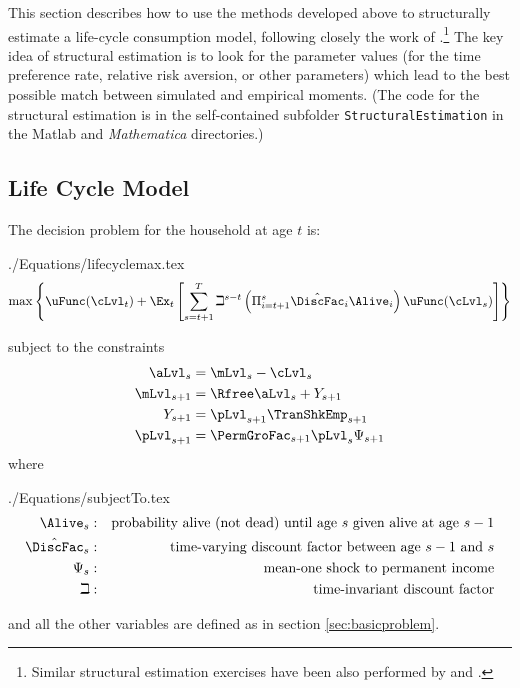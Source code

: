 \documentclass[titlepage, headings=optiontotocandhead]{\econtex}
\newcommand{\Mma}{\textit{Mathematica}}
\begin{document}
This section describes how to use the methods developed above to
structurally estimate a life-cycle consumption model, following
closely the work of
\cite{cagettiWprofiles}.\footnote{Similar structural
  estimation exercises have been also performed by
  \cite{palumbo:medical} and \cite{gpLifecycle}.} The key idea of
structural estimation is to look for the parameter values (for the
time preference rate, relative risk aversion, or other parameters)
which lead to the best possible match between simulated and empirical
moments.  (The code for the structural estimation is in the self-contained
subfolder \texttt{StructuralEstimation} in the Matlab and {\Mma} directories.)

\hypertarget{LifeCycleModel}{}
\subsection{Life Cycle Model}

The decision problem for the household at age $t$ is:
\begin{verbatimwrite}{./Equations/lifecyclemax.tex}
  \begin{equation}
    \max \left\{ \uFunc(\cLvl_{t})+\Ex_{t}\left[\sum_{s=t+1}^{T} {\beth}^{s-t}\left( \Pi _{i=t+1}^{s}\hat{\DiscFac}_{i} \Alive _{i}\right) \uFunc(\cLvl_{s}) \right]\right\}   \label{eq:lifecyclemax}
  \end{equation}
\end{verbatimwrite}
\unskip
subject to the constraints
\begin{equation*}\begin{gathered}\begin{aligned}
      \aLvl_{s}  & = \mLvl_{s}-\cLvl_{s}
      \\      \mLvl_{s+1}  & = \Rfree \aLvl_{s}+Y_{s+1}
      \\      Y_{s+1}  & = \pLvl_{s+1}\TranShkEmp _{s+1}
      \\      \pLvl_{s+1}  & = \PermGroFac_{s+1}\pLvl_{s}\Psi_{s+1}
    \end{aligned}\end{gathered}\end{equation*}
where
\begin{verbatimwrite}{./Equations/subjectTo.tex}
  \begin{equation*}\begin{gathered}\begin{aligned}
        \Alive _{s} &:&\text{probability alive (not dead) until age $s$ given alive at age $s-1$}
        \\      {\hat{\DiscFac}}_{s} &:&\text{time-varying discount factor between age $s-1$ and $s$}
        \\     \Psi_{s} &:&\text{mean-one shock to permanent income}
        \\     \beth &:&\text{time-invariant discount factor}
      \end{aligned}\end{gathered}\end{equation*}
\end{verbatimwrite}
\unskip
and all the other variables are defined as in section \ref{sec:basicproblem}.
\end{document}
